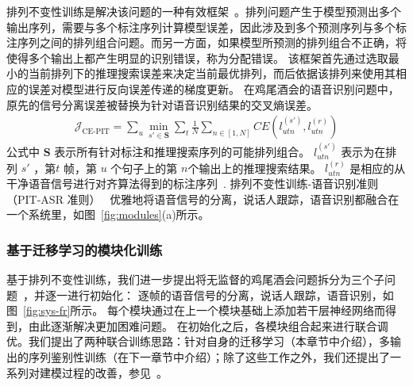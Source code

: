 排列不变性训练是解决该问题的一种有效框架~\cite{yu2017recognizing}。排列问题产生于模型预测出多个输出序列，需要与多个标注序列计算模型误差，因此涉及到多个预测序列与多个标注序列之间的排列组合问题。而另一方面，如果模型所预测的排列组合不正确，将使得多个输出上都产生明显的识别错误，称为分配错误。
该框架首先通过选取最小的当前排列下的推理搜索误差来决定当前最优排列，而后依据该排列来使用其相应的误差对模型进行反向误差传递的梯度更新。
在鸡尾酒会的语音识别问题中，原先的信号分离误差被替换为针对语音识别结果的交叉熵误差。
\begin{equation}
\label{equ:ce-pit}
\begin{split}
\mathcal{J}_{\text{CE-PIT}}=\sum_u \min_{s'\in \mathbf{S}} \sum_t \frac{1}{N} \sum_{n\in[1,N]} CE({l}_{utn}^{(s')},{l}_{utn}^{(r)})
\end{split}
\end{equation}
公式中 $\mathbf{S}$ 表示所有针对标注和推理搜索序列的可能排列组合。
${l}_{utn}^{(s')}$ 表示为在排列 $s'$ ，第$t$ 帧，第 $u$ 个句子上的第 $n$个输出上的推理搜索结果。 ${l}_{utn}^{(r)}$ 是相应的从干净语音信号进行对齐算法得到的标注序列~\cite{woodland1994large}.
排列不变性训练-语音识别准则（PIT-ASR 准则）~\cite{yu2017recognizing} 优雅地将语音信号的分离，说话人跟踪，语音识别都融合在一个系统里，如图~\ref{fig:modules}(a)所示。

\subsubsection{基于迁移学习的模块化训练}
\label{chap:intro2-pit-ts}

基于排列不变性训练，我们进一步提出将无监督的鸡尾酒会问题拆分为三个子问题~\cite{chen2018progressive}，并逐一进行初始化：
逐帧的语音信号的分离，说话人跟踪，语音识别，如图~\ref{fig:sys-fr}所示。 
每个模块通过在上一个模块基础上添加若干层神经网络而得到，由此逐渐解决更加困难问题。
在初始化之后，各模块组合起来进行联合调优。我们提出了两种联合训练思路：针对自身的迁移学习（本章节中介绍），多输出的序列鉴别性训练（在下一章节中介绍）；除了这些工作之外，我们还提出了一系列对建模过程的改善，参见~\cite{chen2018progressive}。


